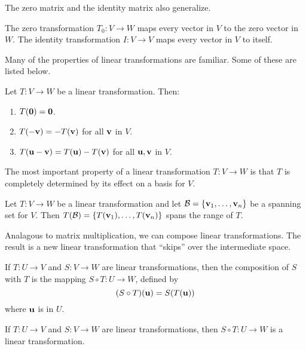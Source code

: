 \documentclass[../m073main.tex]{subfiles}
\begin{document}
The zero matrix and the identity matrix also generalize.

\begin{definition}
	The zero transformation $T_0 : V \to W$ maps every vector in $V$ to the zero vector in $W$.
	The identity transformation $I : V \to V$ maps every vector in $V$ to itself.
\end{definition}

Many of the properties of linear transformations are familiar.
Some of these are listed below.

\begin{theorem}
	Let $T : V \to W$ be a linear transformation.
	Then:
	\begin{enumerate}[label=(\alph*)]
		\item $T(\mathbf{0}) = \mathbf{0}$.
		\item $T(-\mathbf{v}) = -T(\mathbf{v})$ for all $\mathbf{v}$ in $V$.
		\item $T(\mathbf{u} - \mathbf{v}) = T(\mathbf{u}) - T(\mathbf{v})$ for all $\mathbf{u}, \mathbf{v}$ in $V$.
	\end{enumerate}
\end{theorem}

The most important property of a linear transformation $T : V \to W$ is that $T$ is completely determined by its effect on a basis for $V$.

\begin{theorem}
	Let $T : V \to W$ be a linear transformation and let $\mathcal{B} = \{\mathbf{v}_1, \ldots, \mathbf{v}_n\}$ be a spanning set for $V$.
	Then $T(\mathcal{B}) = \{T(\mathbf{v}_1), \ldots, T(\mathbf{v}_n)\}$ spans the range of $T$.
\end{theorem}

Analagous to matrix multiplication, we can compose linear transformations.
The result is a new linear transformation that ``skips'' over the intermediate space.

\begin{definition}
	If $T : U \to V$ and $S : V \to W$ are linear transformations, then the composition of $S$ with $T$ is the mapping $S \circ T : U \to W$, defined by
	\[ (S \circ T)(\mathbf{u}) = S(T(\mathbf{u})) \]
	where $\mathbf{u}$ is in $U$.
\end{definition}

\begin{theorem}
	If $T : U \to V$ and $S : V \to W$ are linear transformations, then $S \circ T : U \to W$ is a linear transformation.
\end{theorem}
\end{document}

